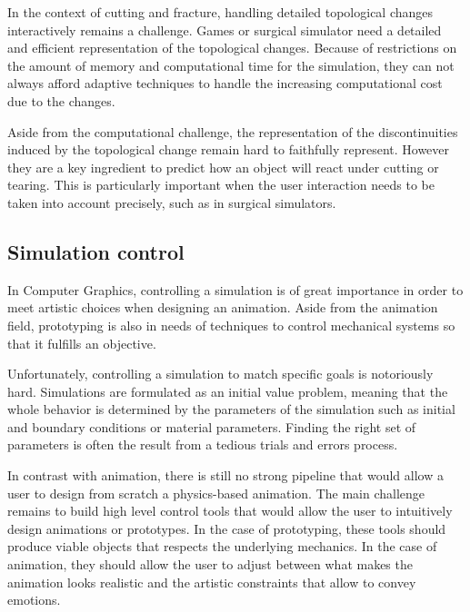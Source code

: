 In the context of cutting and fracture, handling detailed topological changes interactively remains a challenge. Games or surgical simulator need a detailed and efficient representation of the topological changes. Because of restrictions on the amount of memory and computational time for the simulation, they can not always afford adaptive techniques to handle the increasing computational cost due to the changes.

Aside from the computational challenge, the representation of the discontinuities induced by the topological change remain hard to faithfully represent. However they are a key ingredient to predict how an object will react under cutting or tearing. This is particularly important when the user interaction needs to be taken into account precisely, such as in surgical simulators.

\subsection{Simulation control}

In Computer Graphics, controlling a simulation is of great importance in order to meet artistic choices when designing an animation. Aside from the animation field, prototyping is also in needs of techniques to control mechanical systems so that it fulfills an objective.

Unfortunately, controlling a simulation to match specific goals is notoriously hard. Simulations are formulated as an initial value problem, meaning that the whole behavior is determined by the parameters of the simulation such as initial and boundary conditions or material parameters. Finding the right set of parameters is often the result from a tedious trials and errors process.

In contrast with animation, there is still no strong pipeline that would allow a user to design from scratch a physics-based animation. The main challenge remains to build high level control tools that would allow the user to intuitively design animations or prototypes. In the case of prototyping, these tools should produce viable objects that respects the underlying mechanics. In the case of animation, they should allow the user to adjust between what makes the animation looks realistic and the artistic constraints that allow to convey emotions. 

